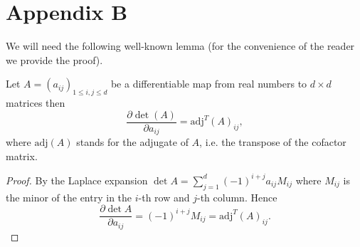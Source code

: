 \section{Appendix B}
\label{a2}

We will need the following well-known lemma (for the convenience of the reader we provide the proof).

\begin{lemma}\label{jacobi}
Let $A = (a_{ij})_{1 \leq i,j \leq d}$ be a differentiable map from real numbers to $d \times d$ matrices then
\begin{equation}
\frac{\partial \det(A)}{\partial a_{ij}} = \mathrm{adj}^T(A)_{ij},
\end{equation}
where $\mathrm{adj}(A)$ stands for the adjugate of $A$, i.e. the transpose of the cofactor matrix.
\end{lemma}

\begin{proof}
By the Laplace expansion $\det A = \sum\limits_{j=1}^{d} (-1)^{i+j} a_{ij} M_{ij}$ where $M_{ij}$ is the minor of the entry in the $i$-th row and $j$-th column. Hence
$$\frac{\partial \det A}{\partial a_{ij}} = (-1)^{i+j} M_{ij} = \mathrm{adj}^T(A)_{ij}.$$
\end{proof}

